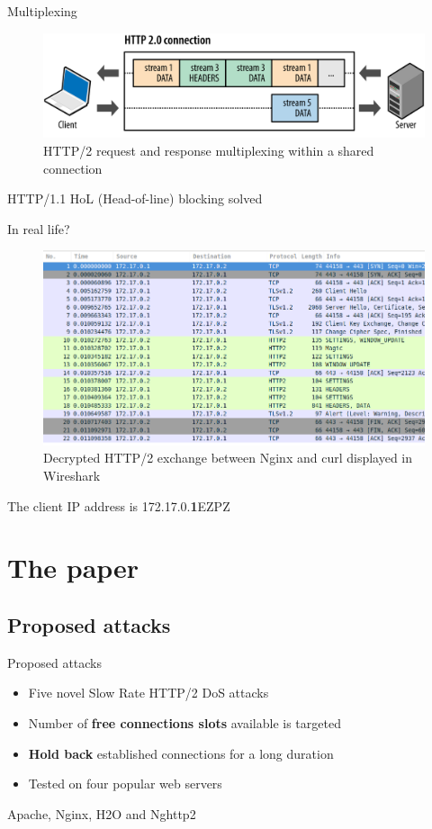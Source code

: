 \documentclass{beamer}
\begin{document}
\begin{frame}{Multiplexing}
  \begin{figure}[t]
    \includegraphics[scale=0.22]{images/http2Conn.png}
	  \caption{HTTP/2 request and response multiplexing within a shared connection~\cite{Grigorik:2013}}
  \end{figure}
	HTTP/1.1 HoL (Head-of-line) blocking solved
\end{frame}

\begin{frame}{In real life?}
  \begin{figure}[t]
    \includegraphics[scale=0.35]{images/HTTP2BasicExchangeNginxCurl.png}
	  \caption{Decrypted HTTP/2 exchange between Nginx and curl displayed in Wireshark}
  \end{figure}
	The client IP address is 172.17.0.\textbf{1}\hspace{10em}\tiny EZPZ
\end{frame}

\section{The paper \cite{Tripathi:2018}}

\subsection{Proposed attacks}

\begin{frame}{Proposed attacks}
\begin{itemize}
	\item Five novel Slow Rate HTTP/2 DoS attacks
	\item Number of \textbf{free connections slots} available is targeted
	\item \textbf{Hold back} established connections for a long duration
	\item Tested on four popular web servers
\end{itemize}
	\begin{center}Apache, Nginx, H2O and Nghttp2\end{center}
\end{frame}
\end{document}
